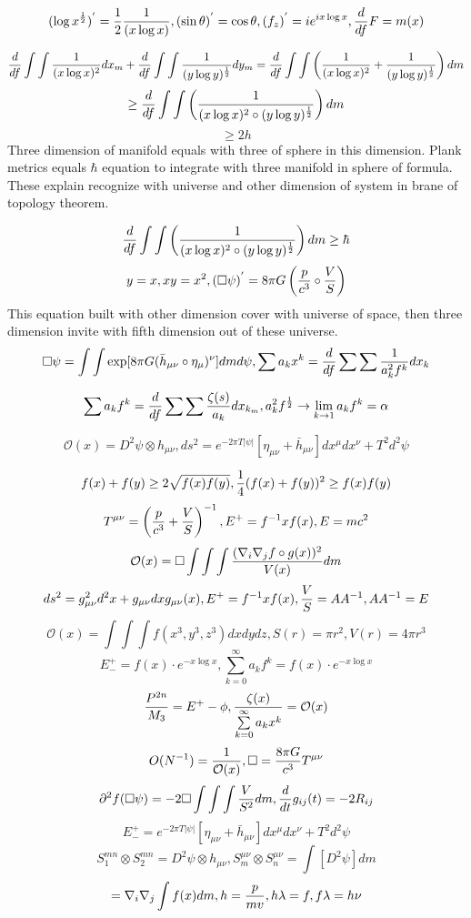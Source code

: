 \documentclass{jsarticle}
\begin{document}
 $$ (\log x^{1 \over 2})^{'} = {1 \over 2}{1 \over (x \log x)},
(\sin \theta)^{'} = \cos \theta, (f_z)^{'} = i e^{i x \log x}, 
{d \over df}F = m(x) $$

$$ {d \over df}\int \int{1 \over (x \log x)^2}dx_m + {d \over df}\int \int {1 \over (y \log y)^{1\over2}}dy_m
= {d \over df} \int \int \left({1 \over (x \log x)^2} + {1 \over (y \log y)^{1 \over 2}}\right)dm $$ 
$$ \ge {d \over df}\int \int \left({1 \over (x \log x)^2 \circ (y \log y)^{1 \over 2}}\right)dm $$
$$ \ge 2h$$
Three dimension of manifold equals with three of sphere in this dimension.
Plank metrics equals $ \hbar $ equation to integrate with three manifold in sphere of formula.
These explain recognize with universe and other dimension of system in brane of topology theorem.

$$ {d \over df}\int \int \left({1 \over (x \log x)^2 \circ (y \log y)^{1 \over 2}}\right)dm  \ge \hbar $$
	$$ y = x, xy = x^2, (\square \psi)^{'} = 8 \pi G\left({p \over c^3}\circ{V \over S}\right) $$
	This equation built with other dimension cover with universe of space, then three dimension 
invite with fifth dimension out of these universe.
$$ \square \psi = \int \int \mathrm{exp}[8 \pi G(\bar{h}_{\mu\nu}\circ \eta_{\mu})^{\nu}]dmd\psi,
\sum a_k x^k = {d \over df} \sum\sum {1 \over a^2_kf^k}dx_k $$


$$ \sum a_k f^k = {d \over df}\sum \sum {\zeta(s) \over a_k}dx_{k_m}, a^2_k f^{1 \over 2} \to 
\lim_{k \to 1}a_k f^k = \alpha $$

$$ \mathcal{O}(x) = D^2 \psi \otimes h_{\mu\nu}, ds^2 = e^{- 2 \pi T|\psi|}[\eta_{\mu\nu} + \bar{h}_{\mu\nu}]
dx^{\mu}dx^{\nu} + T^2 d^2 \psi $$

$$ f(x) + f(y) \ge 2\sqrt{f(x)f(y)}, {1 \over 4}(f(x) + f(y))^2 \ge f(x)f(y) $$
$$ T^{\mu\nu} = \left({p \over c^3} + {V \over S}\right)^{-1}, E^{+} = f^{-1}xf(x), E = mc^2 $$
$$ \mathcal{O}(x) = \square \int \int \int {(\nabla_{i}\nabla_{j}f \circ g(x))^2 \over V(x)}dm $$
$$ ds^2 = g^2_{\mu\nu}d^2x + g_{\mu\nu}dxg_{\mu\nu}(x), E^{+} = f^{-1}xf(x), {V \over S} = AA^{-1}, AA^{-1} = E $$
$$ \mathcal{O}(x) = \int \int \int f(x^3,y^3,z^3)dxdydz, S(r) = \pi r^2, V(r) = 4 \pi r^3 $$
$$ E^{+}_{-} = f(x)\cdot e^{-x \log x}, \sum_{k=0}^{\infty}a_k f^k = f(x)\cdot e^{-x \log x} $$
$$ {P^{2n} \over M_3} = E^{+} - {\phi}, {\zeta(x) \over \sum\limits_{k=0}^{\infty}a_kx^k} = \mathcal{O}(x) $$
$$ O(N^{-1}) = {1 \over \mathcal{O}(x)}, \square = {8 \pi G \over c^3}T^{\mu\nu} $$
$$ \partial^2f(\square \psi) = - 2 \square \int \int \int{V \over S^2}dm, {d \over dt}g_{ij}(t) = - 2 R_{ij} $$
$$ E^{+}_{-} = e^{-2\pi T|\psi|}[\eta_{\mu\nu} + \bar{h}_{\mu\nu}]dx^{\mu}dx^{\nu} + T^2 d^2 \psi $$
$$ S^{mn}_1 \otimes S^{mn}_2 = D^2 \psi \otimes h_{\mu\nu}, S^{\mu\nu}_m \otimes S^{\mu\nu}_n = \int [D^2 \psi]dm $$
$$ = \nabla_{i}\nabla_{j} \int f(x)dm, h = {p \over mv}, h \lambda = f, f \lambda = h \nu $$
\end{document}

